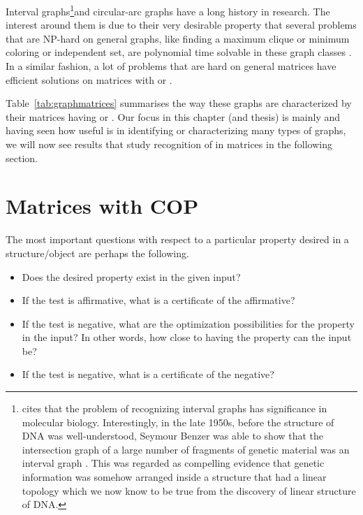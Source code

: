 Interval graphs\footnote{\cite{mcc04} cites that the problem of
  recognizing interval graphs has significance in molecular
  biology. Interestingly, in the late 1950s, before the structure of
  DNA was well-understood, Seymour Benzer was able to show that the
  intersection graph of a large number of fragments of genetic
  material was an interval graph \cite{sb59}. This was regarded as
  compelling evidence that genetic information was somehow arranged
  inside a structure that had a linear topology which we now know to
  be true from the discovery of linear structure of DNA.}and
circular-arc graphs have a long history in research.  The interest
around them is due to their very desirable property that several
problems that are NP-hard 
on general graphs, like finding a maximum clique or minimum coloring
or independent set, are polynomial time solvable in these graph
classes \cite{clrs01}.  In a similar fashion, a lot of problems that
are hard on general matrices have efficient solutions on matrices with
\COP or \CROP \cite[more citations pg.\,33]{d08phd}.

Table~\ref{tab:graphmatrices} summarises the way these graphs are
characterized by their matrices having \COP or \CROP.
Our focus in this chapter (and thesis) is mainly \COP and 
having seen how useful \COP is in identifying or characterizing many
types of graphs, we will now see results that study recognition of \COP
in matrices in the following section.

\tabgraphmatrices  

\section{Matrices with COP}
\label{sec:surveycoptest}

The most important questions with respect to a particular 
property desired in a structure/object are perhaps the following.
\begin{itemize}%
\singlespacing
\item Does the desired property exist in the given input?
\item If the test is affirmative, what is a certificate of the affirmative?
\item If the test is negative, what are the optimization possibilities
  for the property in the input? In other words, how close to having the
  property can the input be?
\item If the test is negative, what is a certificate of the negative?
\end{itemize}

